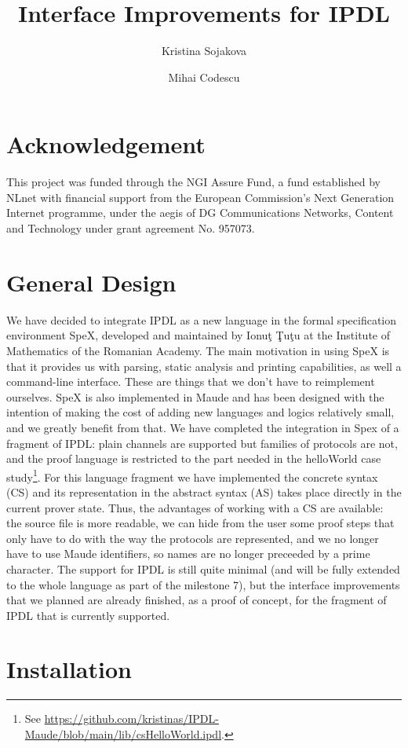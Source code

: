 \documentclass{article}
\title{Interface Improvements for IPDL}
\author{Kristina Sojakova \and Mihai Codescu}
\date{}
\begin{document}
\maketitle
\section*{\small Acknowledgement}
This project was funded through the NGI Assure Fund, a fund established by NLnet with financial support from the European Commission's Next Generation Internet programme, under the aegis of DG Communications Networks, Content and Technology under grant agreement No. 957073.
\section{General Design}

We have decided to integrate IPDL as a new language in the formal specification environment SpeX, developed and maintained by 
Ionu\c{t} \c{T}u\c{t}u at the Institute of Mathematics of the Romanian Academy. The main motivation in using SpeX is that it provides us
with parsing, static analysis and printing capabilities,
as well a command-line interface.  
These are things that we don't have to reimplement ourselves. 
SpeX is also implemented in Maude and has been designed with the
intention of making the cost of adding new languages and logics 
relatively small, and we greatly benefit from that. 
We have completed the integration in Spex 
of a fragment of IPDL: 
plain channels are supported but families of 
protocols are not, and the proof language is restricted to the part needed
in the helloWorld case study\footnote{See \url{https://github.com/kristinas/IPDL-Maude/blob/main/lib/csHelloWorld.ipdl}.}. For this language fragment we
have implemented the concrete syntax (CS) and its representation in the
abstract syntax (AS) takes place directly in the current prover state. 
Thus, the advantages of working with a CS are available:
the source file is more readable, we can hide from the user
some proof steps that only have to do with the way the protocols are 
represented, and we no longer have to use Maude identifiers, so names are
no longer preceeded by a prime character. The support for IPDL is still 
quite minimal (and will be fully extended to the whole language as part of the milestone 7), but the interface improvements that we planned are
already finished, as a proof of concept, for the fragment of IPDL that
is currently supported.

\section{Installation}
\end{document}

